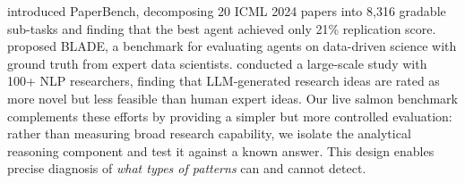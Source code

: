 \citet{starace2025paperbench} introduced PaperBench, decomposing 20 ICML 2024 papers into 8,316 gradable sub-tasks and finding that the best agent achieved only 21\% replication score.
\citet{gu2024blade} proposed BLADE, a benchmark for evaluating agents on data-driven science with ground truth from expert data scientists.
\citet{si2024can} conducted a large-scale study with 100+ NLP researchers, finding that LLM-generated research ideas are rated as more novel but less feasible than human expert ideas.
Our live salmon benchmark complements these efforts by providing a simpler but more controlled evaluation: rather than measuring broad research capability, we isolate the analytical reasoning component and test it against a known answer.
This design enables precise diagnosis of \textit{what types of patterns} \aiscientists can and cannot detect.
